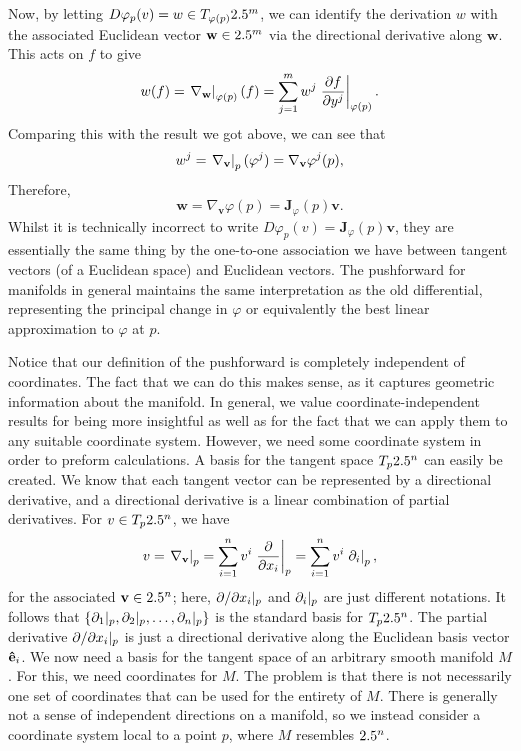 \documentclass[a4paper,12pt]{article}
\begin{document}
Now, by letting $D\varphi_p (v) = w \in T_{\varphi(p)} 2.5^m$, we can identify the derivation $w$ with the associated Euclidean vector $\mathbf{w} \in 2.5^m$ via the directional derivative along $\mathbf{w}$.
This acts on $f$ to give
\begin{equation*}
    w(f) = \eval{\nabla_{\mathbf{w}}}{\varphi(p)} (f) = \sum_{j=1}^{m} w^j \eval{\frac{\partial f}{\partial y^j}}{\varphi(p)}.
\end{equation*}
Comparing this with the result we got above, we can see that
\begin{equation*}
    w^j = \eval{\nabla_\mathbf{v}}{p} (\varphi^j) = \nabla_\mathbf{v}\varphi^j(p),
\end{equation*}
Therefore,
\begin{equation*}
    \mathbf{w} = \nabla_\mathbf{v} \varphi(p) = \mathbf{J}_\varphi(p) \mathbf{v}.
\end{equation*}
Whilst it is technically incorrect to write $D\varphi_p(v) = \mathbf{J}_\varphi(p) \mathbf{v}$, they are essentially the same thing by the one-to-one association we have between tangent vectors (of a Euclidean space) and Euclidean vectors.
The pushforward for manifolds in general maintains the same interpretation as the old differential, representing the principal change in $\varphi$ or equivalently the best linear approximation to $\varphi$ at $p$.

Notice that our definition of the pushforward is completely independent of coordinates.
The fact that we can do this makes sense, as it captures geometric information about the manifold.
In general, we value coordinate-independent results for being more insightful as well as for the fact that we can apply them to any suitable coordinate system.
However, we need some coordinate system in order to preform calculations.
A basis for the tangent space $T_p 2.5^n$ can easily be created.
We know that each tangent vector can be represented by a directional derivative, and a directional derivative is a linear combination of partial derivatives.
For $v \in T_p 2.5^n$, we have
\begin{equation*}
    v = \eval{\nabla_\mathbf{v}}{p} = \sum_{i=1}^{n} v^i \eval{\frac{\partial}{\partial x_i}}{p} = \sum_{i=1}^{n} v^i \eval{\partial_{i}}{p},
\end{equation*}
for the associated $\mathbf{v} \in 2.5^n$; here, $\eval*{\partial/\partial x_i}{p}$ and $\eval*{\partial_{i}}{p}$ are just different notations.
It follows that $\{\eval*{\partial_1}{p}, \eval*{\partial_2}{p}, \ldots, \eval*{\partial_n}{p}\}$ is the standard basis for $T_p2.5^n$.
The partial derivative $\eval*{\partial/\partial x_i}{p}$ is just a directional derivative along the Euclidean basis vector $\mathbf{\hat{e}}_i$.
We now need a basis for the tangent space of an arbitrary smooth manifold $M$.
For this, we need coordinates for $M$.
The problem is that there is not necessarily one set of coordinates that can be used for the entirety of $M$.
There is generally not a sense of independent directions on a manifold, so we instead consider a coordinate system local to a point $p$, where $M$ resembles $2.5^n$.
\end{document}
